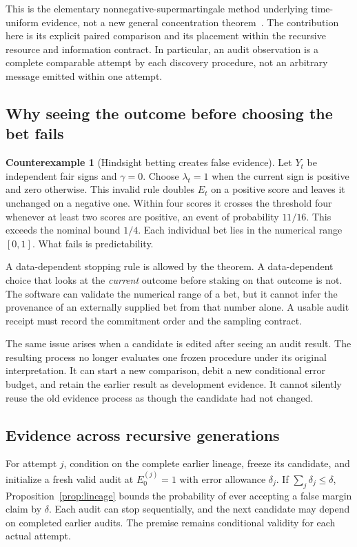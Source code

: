 \documentclass[11pt,letterpaper]{article}
\theoremstyle{plain}
\theoremstyle{definition}
\newtheorem{counterexample}[theorem]{Counterexample}
\begin{document}
This is the elementary nonnegative-supermartingale method underlying time-uniform evidence, not a new general concentration theorem~\cite{howard}. The contribution here is its explicit paired comparison and its placement within the recursive resource and information contract. In particular, an audit observation is a complete comparable attempt by each discovery procedure, not an arbitrary message emitted within one attempt.

\subsection{Why seeing the outcome before choosing the bet fails}
\begin{counterexample}[Hindsight betting creates false evidence]\label{ex:hindsight-bet}
Let $Y_t$ be independent fair signs and $\gamma=0$. Choose $\lambda_t=1$ when the current sign is positive and zero otherwise. This invalid rule doubles $E_t$ on a positive score and leaves it unchanged on a negative one. Within four scores it crosses the threshold four whenever at least two scores are positive, an event of probability $11/16$. This exceeds the nominal bound $1/4$. Each individual bet lies in the numerical range $[0,1]$. What fails is predictability.
\end{counterexample}

A data-dependent stopping rule is allowed by the theorem. A data-dependent choice that looks at the \emph{current} outcome before staking on that outcome is not. The software can validate the numerical range of a bet, but it cannot infer the provenance of an externally supplied bet from that number alone. A usable audit receipt must record the commitment order and the sampling contract.

The same issue arises when a candidate is edited after seeing an audit result. The resulting process no longer evaluates one frozen procedure under its original interpretation. It can start a new comparison, debit a new conditional error budget, and retain the earlier result as development evidence. It cannot silently reuse the old evidence process as though the candidate had not changed.

\subsection{Evidence across recursive generations}
For attempt $j$, condition on the complete earlier lineage, freeze its candidate, and initialize a fresh valid audit at $E_0^{(j)}=1$ with error allowance $\delta_j$. If $\sum_j\delta_j\leq\delta$, Proposition~\ref{prop:lineage} bounds the probability of ever accepting a false margin claim by $\delta$. Each audit can stop sequentially, and the next candidate may depend on completed earlier audits. The premise remains conditional validity for each actual attempt.
\end{document}
